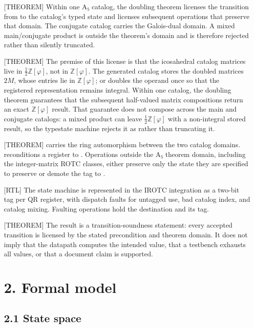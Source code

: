 \documentclass[11pt]{article}
\begin{document}
[THEOREM] Within one A₅ catalog, the doubling theorem licenses the transition from  to the catalog's typed state and licenses subsequent operations that preserve that domain. The conjugate catalog carries the Galois-dual domain. A mixed main/conjugate product is outside the theorem's domain and is therefore rejected rather than silently truncated.

[THEOREM] The premise of this license is that the icosahedral catalog matrices live in $\frac{1}{2}\mathbb{Z}[\varphi]$, not in $\mathbb{Z}[\varphi]$. The generated catalog stores the doubled matrices $2M$, whose entries lie in $\mathbb{Z}[\varphi]$;  or  doubles the operand once so that the registered representation remains integral. Within one catalog, the doubling theorem guarantees that the subsequent half-valued matrix compositions return an exact $\mathbb{Z}[\varphi]$ result. That guarantee does not compose across the main and conjugate catalogs: a mixed product can leave $\frac{1}{2}\mathbb{Z}[\varphi]$ with a non-integral stored result, so the typestate machine rejects it as  rather than truncating it.

[THEOREM]  carries the ring automorphism between the two catalog domains.  reconditions a register to . Operations outside the A₅ theorem domain, including the integer-matrix ROTC classes, either preserve only the state they are specified to preserve or demote the tag to .

[RTL] The state machine is represented in the IROTC integration as a two-bit tag per QR register, with dispatch faults for untagged use, bad catalog index, and catalog mixing. Faulting operations hold the destination and its tag.

[THEOREM] The result is a transition-soundness statement: every accepted transition is licensed by the stated precondition and theorem domain. It does not imply that the datapath computes the intended value, that a testbench exhausts all values, or that a document claim is supported.

\section{2. Formal model}

\subsection{2.1 State space}
\end{document}
